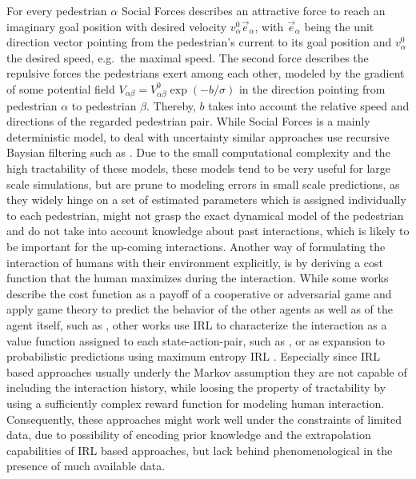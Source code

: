 For every pedestrian $\alpha$ Social Forces describes an attractive force to reach an imaginary goal position with desired velocity $v^0_{\alpha} \vec{e}_{\alpha}$, with $\vec{e}_{\alpha}$ being the unit direction vector pointing from the pedestrian's current to its goal position and $v^0_{\alpha}$ the desired speed, e.g.\ the maximal speed. The second force describes the repulsive forces the pedestrians exert among each other, modeled by the gradient of some potential field $V_{\alpha \beta} = V_{\alpha \beta}^0 \exp(-b / \sigma)$ in the direction pointing from pedestrian $\alpha$ to pedestrian $\beta$. Thereby, $b$ takes into account the relative speed and directions of the regarded pedestrian pair. While Social Forces is a mainly deterministic model, to deal with uncertainty similar approaches use recursive Baysian filtering such as \cite{Schneider2013}\cite{Rehder2015}\cite{Guo2016}. Due to the small computational complexity and the high tractability of these models, these models tend to be very useful for large scale simulations, but are prune to modeling errors in small scale predictions, as they widely hinge on a set of estimated parameters which is assigned individually to each pedestrian, might not grasp the exact dynamical model of the pedestrian and do not take into account knowledge about past interactions, which is likely to be important for the up-coming interactions.
\newline
Another way of formulating the interaction of humans with their environment explicitly, is by deriving a cost function that the human maximizes during the interaction. While some works describe the cost function as a payoff of a cooperative or adversarial game and apply game theory to predict the behavior of the other agents as well as of the agent itself, such as \cite{Bouzat2014}\cite{Nikolaidis2017}, other works use \ac{IRL} \cite{Ng2000} to characterize the interaction as a value function assigned to each state-action-pair, such as \cite{Fahad2018}\cite{Fernando2019}\cite{Saleh2018}, or as expansion to probabilistic predictions using maximum entropy \ac{IRL} \cite{Ziebart2008}. Especially since \ac{IRL} based approaches usually underly the Markov assumption they are not capable of including the interaction history, while loosing the property of tractability by using a sufficiently complex reward function for modeling human interaction. Consequently, these approaches might work well under the constraints of limited data, due to possibility of encoding prior knowledge and the extrapolation capabilities of \ac{IRL} based approaches, but lack behind phenomenological in the presence of much available data.

